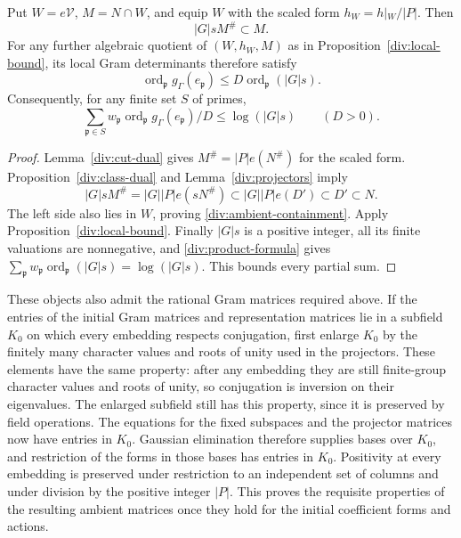 \begin{theorem}\label{div:ambient-exponent}
Put $W=e\mathcal V$, $M=N\cap W$, and equip $W$ with the scaled form
$h_W=h|_W/|P|$. Then
\begin{equation}\label{div:ambient-containment}
                         |G|sM^\#\subset M.
\end{equation}
For any further algebraic quotient of $(W,h_W,M)$ as in
Proposition~\ref{div:local-bound}, its local Gram determinants therefore
satisfy
\[
 \operatorname{ord}_{\mathfrak p}g_\Gamma(e_{\mathfrak p})
             \le D\operatorname{ord}_{\mathfrak p}(|G|s).
\]
Consequently, for any finite set $S$ of primes,
\[
 \sum_{\mathfrak p\in S}w_{\mathfrak p}
             \operatorname{ord}_{\mathfrak p}g_\Gamma(e_{\mathfrak p})/D
                         \le\log(|G|s)\qquad(D>0).
\]
\end{theorem}
\begin{proof}
Lemma~\ref{div:cut-dual} gives $M^\#=|P|e(N^\#)$ for the scaled
form. Proposition~\ref{div:class-dual} and
Lemma~\ref{div:projectors} imply
\[
 |G|sM^\#=|G||P|e(sN^\#)\subset |G||P|e(D')\subset D'\subset N.
\]
The left side also lies in $W$, proving
\eqref{div:ambient-containment}. Apply
Proposition~\ref{div:local-bound}. Finally $|G|s$ is a positive
integer, all its finite valuations are nonnegative, and
\eqref{div:product-formula} gives
$\sum_{\mathfrak p}w_{\mathfrak p}
\operatorname{ord}_{\mathfrak p}(|G|s)=\log(|G|s)$.
This bounds every partial sum.
\end{proof}

These objects also admit the rational Gram matrices required above.
If the entries of the initial Gram matrices and representation matrices
lie in a subfield $K_0$ on which every embedding respects conjugation,
first enlarge $K_0$ by the finitely many character values and roots of
unity used in the projectors. These elements have the same property:
after any embedding
they are still finite-group character values and roots of unity, so
conjugation is inversion on their eigenvalues. The enlarged subfield
still has this property, since it is preserved by field operations.
The equations for the fixed subspaces and the projector matrices now
have entries in $K_0$. Gaussian elimination
therefore supplies bases over $K_0$, and restriction of the forms in
those bases has entries in $K_0$. Positivity at every embedding is
preserved under restriction to an independent set of columns and under
division by the positive integer $|P|$. This proves the requisite
properties of the resulting ambient matrices once they hold for the
initial coefficient forms and actions.

